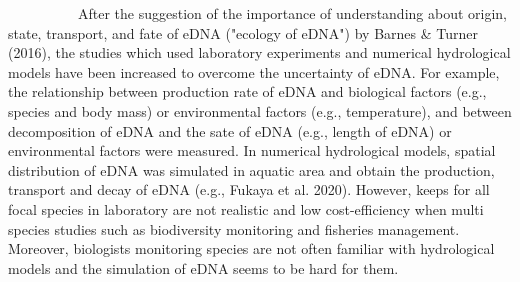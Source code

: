 \documentclass[12pt]{article}
\begin{document}
\begin{linenumbers}
\ \ \ \ \ \ \ \ \ \ 
After the suggestion of the importance of understanding about origin, state, transport, and fate of eDNA ("ecology of eDNA") by Barnes \& Turner (2016), the studies which used laboratory experiments and numerical hydrological models have been increased to overcome the uncertainty of eDNA. 
For example, the relationship between production rate of eDNA and biological factors (e.g., species and body mass) or environmental factors (e.g., temperature), and between decomposition of eDNA and the sate of eDNA (e.g., length of eDNA) or environmental factors were measured. In numerical hydrological models, spatial distribution of eDNA was simulated in aquatic area and obtain the production, transport and decay of eDNA (e.g., Fukaya et al. 2020). %
However, keeps for all focal species in laboratory are not realistic and low cost-efficiency when multi species studies such as biodiversity monitoring and fisheries management. Moreover, biologists monitoring species are not often familiar with hydrological models and the simulation of eDNA seems to be hard for them.


\end{linenumbers}
\end{document}
